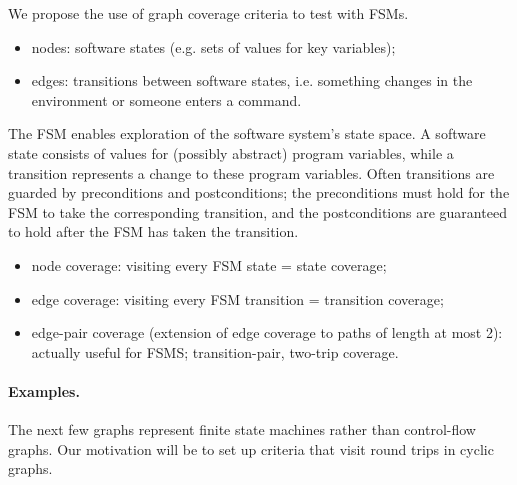 \documentclass[11pt]{article}
\begin{document}
We propose the use of graph coverage criteria to test with FSMs.
\begin{itemize}
\item nodes: software states (e.g. sets of values for key variables);
\item edges: transitions between software states, i.e. something changes
in the environment or someone enters a command.
\end{itemize}
The FSM enables exploration of the software system's state space.  A
software state consists of values for (possibly abstract) program
variables, while a transition represents a change to these program
variables. Often transitions are guarded by preconditions and
postconditions; the preconditions must hold for the FSM to take the
corresponding transition, and the postconditions are guaranteed to
hold after the FSM has taken the transition.

\begin{itemize}
\item node coverage: visiting every FSM state = state coverage;
\item edge coverage: visiting every FSM transition = transition coverage;
\item edge-pair coverage (extension of edge coverage to paths of length at most 2): actually useful for FSMS; transition-pair, two-trip coverage.
\end{itemize}

\paragraph{Examples.} The next few graphs represent finite state machines
rather than control-flow graphs. Our motivation will be to set up
criteria that visit round trips in cyclic graphs.
\end{document}
